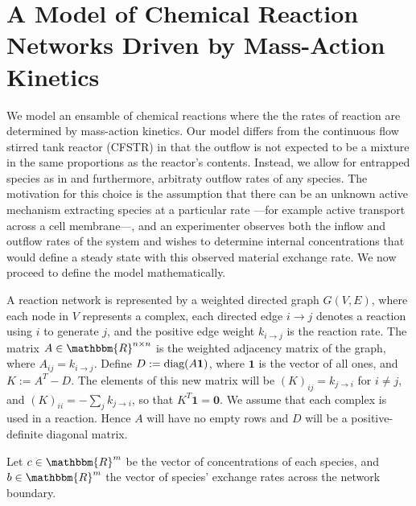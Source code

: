 \documentclass[smallextended]{svjour3}       %
\newcounter{sent}
\newcommand*{\diag}{\mbox{\rm diag}}
\newcommand*{\0}{\mathbf{0}}
\newcommand*{\1}{\mathbf{1}}
\newcommand*{\R}{\mathbbm{R}}
\begin{document}
\section{A Model of Chemical Reaction Networks Driven by Mass-Action Kinetics}
\label{section:crnt-model} 
We model an ensamble of chemical reactions where the the rates of reaction are
determined by mass-action kinetics.  Our model differs from the continuous flow
stirred tank reactor (CFSTR) in that the outflow is not expected to be a
mixture in the same proportions as the reactor's contents. Instead, we allow
for entrapped species as in \cite{feinberg-entrapped} and furthermore, arbitraty
outflow rates of any species. The motivation for this choice is the assumption
that there can be an unknown active mechanism extracting species at a
particular rate ---for example active transport across a cell membrane---, and an
experimenter observes both the inflow and outflow rates of the system and wishes to
determine internal concentrations that would define a steady state with this
observed material exchange rate. We now proceed to define the model
mathematically.

A reaction network is represented by a weighted directed graph
$G(V,E)$, where each node in $V$ represents a complex, each directed edge
$i\rightarrow j$ denotes a reaction using $i$ to generate $j$, and the
positive edge weight $k_{i\rightarrow j}$ is the reaction rate. The matrix $A
\in \R^{n \times n}$ is the weighted adjacency matrix of the graph, where
$A_{ij}=k_{i\rightarrow j}$.  Define $D := \diag(A\1)$, where $\1$ is the
vector of all ones, and $K := A^T-D$.  The elements of this new matrix will
be $(K)_{ij} = k_{j \rightarrow i}$ for $i \neq j$, and $(K)_{ii} = -\sum_j
k_{j \rightarrow i}$, so that $K^T \1 = \0$.  We assume that each complex
is used in a reaction. Hence $A$ will have no empty rows and $D$ will 
be a positive-definite diagonal matrix.

Let $c \in \R^m$ be the vector of concentrations of each species, and $b \in
\R^m$ the vector of species' exchange rates across the network boundary.
\end{document}
